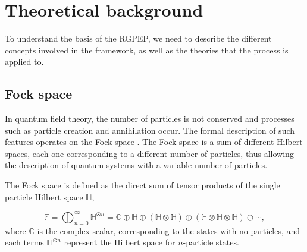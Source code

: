 \documentclass[11pt,a4paper,twoside,pdf]{article}
\numberwithin{equation}{section}
\begin{document}
\section{Theoretical background} \label{sec:theoretical_background}

To understand the basis of the RGPEP, we need to describe the different
concepts involved in the framework, as well as the theories that the process is
applied to.

\subsection{Fock space} \label{sec:fock_space}

In quantum field theory, the number of particles is not conserved 
and processes such as particle creation and annihilation occur. The formal 
description of such features operates on the Fock space 
\cite{1932ZPhy...75..622F}. The Fock space is a sum 
of different Hilbert spaces, each one corresponding to a different number of particles, 
thus allowing the description of quantum systems with a variable number of particles. 


The Fock space is defined as the direct sum of tensor products of the single 
particle Hilbert space $\mathbb{H}$,

\begin{equation}
    \mathbb{F} = \bigoplus_{n=0}^{\infty}  \mathbb{H}^{\otimes n} = 
    \mathbb{C} \oplus \mathbb{H} \oplus (\mathbb{H} \otimes \mathbb{H}) 
    \oplus (\mathbb{H} \otimes \mathbb{H}\otimes \mathbb{H}) \oplus \cdots,
\end{equation}
where $\mathbb{C}$ is the complex scalar, corresponding to the states with no particles,
and each terms \( \mathbb{H}^{\otimes n} \) represent the Hilbert space for 
\( n \)-particle states.
\end{document}
